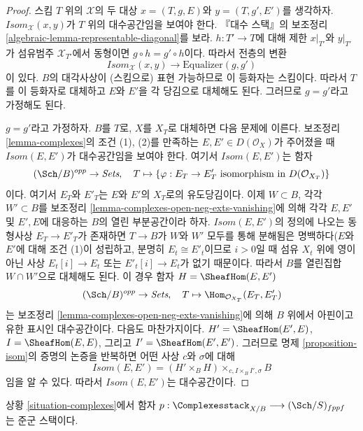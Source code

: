 \begin{proof}
스킴 $T$ 위의 $\mathcal{X}$의 두 대상 $x = (T, g, E)$와
$y = (T, g', E')$를 생각하자. $\mathit{Isom}_\mathcal{X}(x, y)$가 $T$ 위의
대수공간임을 보여야 한다. 『대수 스택』의 보조정리
\ref{algebraic-lemma-representable-diagonal}를 보라. $h : T' \to T$에 대해 제한
$x|_{T'}$와 $y|_{T'}$가 섬유범주 $\mathcal{X}_{T'}$에서 동형이면
$g \circ h = g' \circ h$이다. 따라서 전층의 변환
$$
\mathit{Isom}_\mathcal{X}(x, y) \longrightarrow \text{Equalizer}(g, g')
$$
이 있다. $B$의 대각사상이 (스킴으로) 표현 가능하므로 이 등화자는 스킴이다.
따라서 $T$를 이 등화자로 대체하고 $E$와 $E'$을 각 당김으로 대체해도 된다.
그러므로 $g = g'$라고 가정해도 된다.

\medskip\noindent
$g = g'$라고 가정하자. $B$를 $T$로, $X$를 $X_T$로 대체하면 다음 문제에
이른다. 보조정리 \ref{lemma-complexes}의 조건 (1), (2)를 만족하는
$E, E' \in D(\mathcal{O}_X)$가 주어졌을 때 $\mathit{Isom}(E, E')$가
대수공간임을 보여야 한다. 여기서 $\mathit{Isom}(E, E')$는 함자
$$
(\Sch/B)^{opp} \to \textit{Sets},\quad
T \mapsto \{\varphi : E_T \to E'_T
\text{ isomorphism in }D(\mathcal{O}_{X_T})\}
$$
이다. 여기서 $E_T$와 $E'_T$는 $E$와 $E'$의 $X_T$로의 유도당김이다.
이제 $W \subset B$, 각각 $W' \subset B$를 보조정리
\ref{lemma-complexes-open-neg-exts-vanishing}에 의해 각각 $E, E'$ 및 $E', E$에
대응하는 $B$의 열린 부분공간이라 하자. $\mathit{Isom}(E, E')$의 정의에 나오는
동형사상 $E_T \to E'_T$가 존재하면 $T \to B$가 $W$와 $W'$ 모두를 통해
분해됨은 명백하다($E$와 $E'$에 대해 조건 (1)이 성립하고, 분명히
$E_t \cong E'_t$이므로 $i > 0$일 때 섬유 $X_t$ 위에 영이 아닌 사상
$E_t[i] \to E_t$ 또는 $E'_t[i] \to E_t$가 없기 때문이다. 따라서 $B$를
열린집합 $W \cap W'$으로 대체해도 된다. 이 경우 함자
$H = \SheafHom(E, E')$
$$
(\Sch/B)^{opp} \to \textit{Sets},\quad T \mapsto
\Hom_{\mathcal{O}_{X_T}}(E_T, E'_T)
$$
는 보조정리 \ref{lemma-complexes-open-neg-exts-vanishing}에 의해 $B$ 위에서
아핀이고 유한 표시인 대수공간이다. 다음도 마찬가지이다.
$H' = \SheafHom(E', E)$,
$I = \SheafHom(E, E)$, 그리고
$I' = \SheafHom(E', E')$.
그러므로 명제 \ref{proposition-isom}의 증명의 논증을 반복하면 어떤 사상
$c$와 $\sigma$에 대해
$$
\mathit{Isom}(E, E') = (H' \times_B H) \times_{c, I \times_B I', \sigma} B
$$
임을 알 수 있다. 따라서 $\mathit{Isom}(E, E')$는 대수공간이다.
\end{proof}

\begin{lemma}
\label{lemma-complexes-stack}
상황 \ref{situation-complexes}에서 함자
$p : \Complexesstack_{X/B} \longrightarrow (\Sch/S)_{fppf}$
는 준군 스택이다.
\end{lemma}

